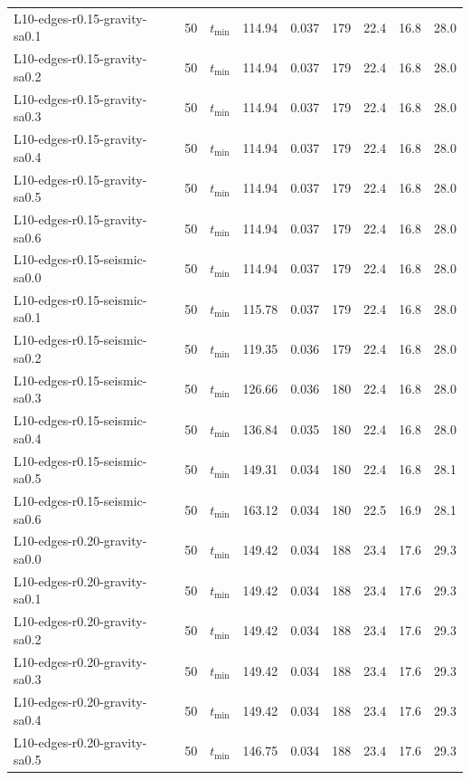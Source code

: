 \begin{tabular}{lrlrrrrrr}
L10-edges-r0.15-gravity-sa0.1 & 50 & $t_{\mathrm{min}}$ & 114.94 & 0.037 & 179 & 22.4 & 16.8 & 28.0 \\
L10-edges-r0.15-gravity-sa0.2 & 50 & $t_{\mathrm{min}}$ & 114.94 & 0.037 & 179 & 22.4 & 16.8 & 28.0 \\
L10-edges-r0.15-gravity-sa0.3 & 50 & $t_{\mathrm{min}}$ & 114.94 & 0.037 & 179 & 22.4 & 16.8 & 28.0 \\
L10-edges-r0.15-gravity-sa0.4 & 50 & $t_{\mathrm{min}}$ & 114.94 & 0.037 & 179 & 22.4 & 16.8 & 28.0 \\
L10-edges-r0.15-gravity-sa0.5 & 50 & $t_{\mathrm{min}}$ & 114.94 & 0.037 & 179 & 22.4 & 16.8 & 28.0 \\
L10-edges-r0.15-gravity-sa0.6 & 50 & $t_{\mathrm{min}}$ & 114.94 & 0.037 & 179 & 22.4 & 16.8 & 28.0 \\
L10-edges-r0.15-seismic-sa0.0 & 50 & $t_{\mathrm{min}}$ & 114.94 & 0.037 & 179 & 22.4 & 16.8 & 28.0 \\
L10-edges-r0.15-seismic-sa0.1 & 50 & $t_{\mathrm{min}}$ & 115.78 & 0.037 & 179 & 22.4 & 16.8 & 28.0 \\
L10-edges-r0.15-seismic-sa0.2 & 50 & $t_{\mathrm{min}}$ & 119.35 & 0.036 & 179 & 22.4 & 16.8 & 28.0 \\
L10-edges-r0.15-seismic-sa0.3 & 50 & $t_{\mathrm{min}}$ & 126.66 & 0.036 & 180 & 22.4 & 16.8 & 28.0 \\
L10-edges-r0.15-seismic-sa0.4 & 50 & $t_{\mathrm{min}}$ & 136.84 & 0.035 & 180 & 22.4 & 16.8 & 28.0 \\
L10-edges-r0.15-seismic-sa0.5 & 50 & $t_{\mathrm{min}}$ & 149.31 & 0.034 & 180 & 22.4 & 16.8 & 28.1 \\
L10-edges-r0.15-seismic-sa0.6 & 50 & $t_{\mathrm{min}}$ & 163.12 & 0.034 & 180 & 22.5 & 16.9 & 28.1 \\
L10-edges-r0.20-gravity-sa0.0 & 50 & $t_{\mathrm{min}}$ & 149.42 & 0.034 & 188 & 23.4 & 17.6 & 29.3 \\
L10-edges-r0.20-gravity-sa0.1 & 50 & $t_{\mathrm{min}}$ & 149.42 & 0.034 & 188 & 23.4 & 17.6 & 29.3 \\
L10-edges-r0.20-gravity-sa0.2 & 50 & $t_{\mathrm{min}}$ & 149.42 & 0.034 & 188 & 23.4 & 17.6 & 29.3 \\
L10-edges-r0.20-gravity-sa0.3 & 50 & $t_{\mathrm{min}}$ & 149.42 & 0.034 & 188 & 23.4 & 17.6 & 29.3 \\
L10-edges-r0.20-gravity-sa0.4 & 50 & $t_{\mathrm{min}}$ & 149.42 & 0.034 & 188 & 23.4 & 17.6 & 29.3 \\
L10-edges-r0.20-gravity-sa0.5 & 50 & $t_{\mathrm{min}}$ & 146.75 & 0.034 & 188 & 23.4 & 17.6 & 29.3 \\

\end{tabular}
